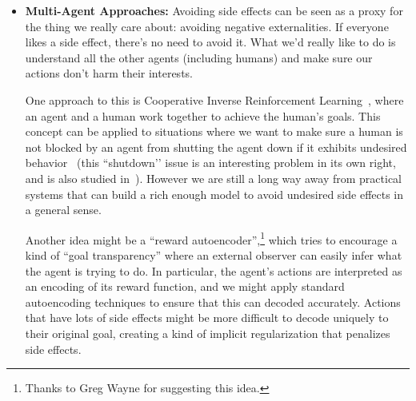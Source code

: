 \documentclass[a4paper,10pt]{article}
\begin{document}
\begin{itemize}
This idea as written would not quite work, because empowerment measures precision of control over the environment more than total impact.  If an agent can press or not press a button to cut electrical power to a million houses, that only counts as one bit of empowerment (since the action space has only one bit, its mutual information with the environment is at most one bit), while obviously having a huge impact.  Conversely, if there's someone in the environment scribbling down the agent's actions, that counts as maximum empowerment even if the impact is low. Furthermore, naively penalizing empowerment can also create perverse incentives, such as destroying a vase in order to remove the option to break it in the future.

Despite these issues, the example of empowerment does show that simple measures (even purely information-theoretic ones!) are capable of capturing very general notions of influence on the environment. Exploring variants of empowerment penalization that more precisely capture the notion of avoiding influence is a potential challenge for future research.

\item {\bf Multi-Agent Approaches:} Avoiding side effects can be seen as a proxy for the thing we really care about: avoiding negative externalities. If everyone likes a side effect, there’s no need to avoid it. What we’d really like to do is understand all the other agents (including humans) and make sure our actions don’t harm their interests.

One approach to this is Cooperative Inverse Reinforcement Learning~\cite{hadfield2016cooperative}, where an agent and a human work together to achieve the human’s goals. This concept can be applied to situations where we want to make sure a human is not blocked by an agent from shutting the agent down if it exhibits undesired behavior~\cite{hadfield2016off} (this ``shutdown’’ issue is an interesting problem in its own right, and is also studied in~\cite{orseau2016safely}).  However we are still a long way away from practical systems that can build a rich enough model to avoid undesired side effects in a general sense.


Another idea might be a ``reward autoencoder”,\footnote{Thanks to Greg Wayne for suggesting this idea.} which tries to encourage a kind of ``goal transparency'' where an external observer can easily infer what the agent is trying to do.  In particular, the agent’s actions are interpreted as an encoding of its reward function, and we might apply standard autoencoding techniques to ensure that this can decoded accurately.  Actions that have lots of side effects might be more difficult to decode uniquely to their original goal, creating a kind of implicit regularization that penalizes side effects.



\end{itemize}
\end{document}
